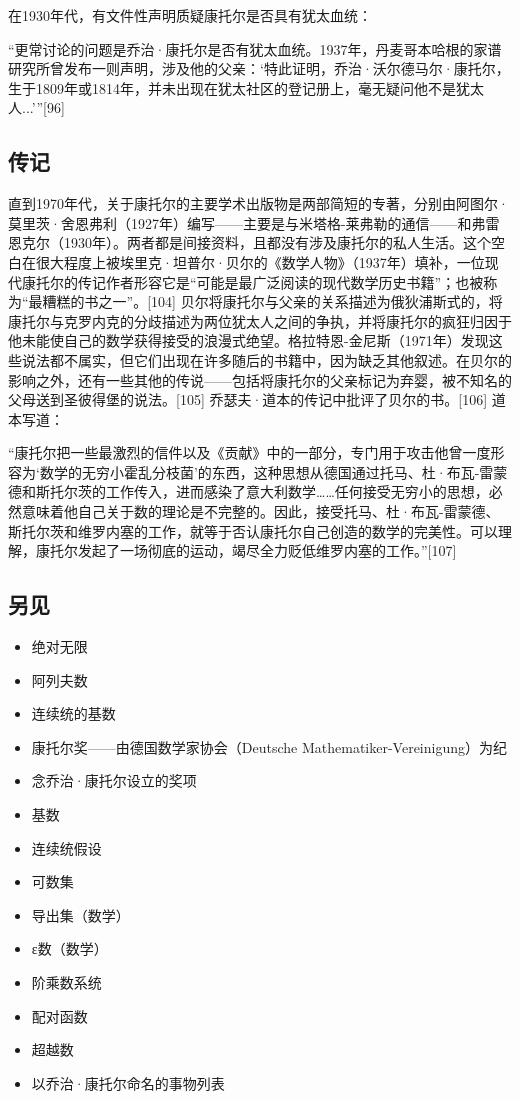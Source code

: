 在1930年代，有文件性声明质疑康托尔是否具有犹太血统：

“更常讨论的问题是乔治·康托尔是否有犹太血统。1937年，丹麦哥本哈根的家谱研究所曾发布一则声明，涉及他的父亲：‘特此证明，乔治·沃尔德马尔·康托尔，生于1809年或1814年，并未出现在犹太社区的登记册上，毫无疑问他不是犹太人...’”[96]
\subsection{传记}  
直到1970年代，关于康托尔的主要学术出版物是两部简短的专著，分别由阿图尔·莫里茨·舍恩弗利（1927年）编写——主要是与米塔格-莱弗勒的通信——和弗雷恩克尔（1930年）。两者都是间接资料，且都没有涉及康托尔的私人生活。这个空白在很大程度上被埃里克·坦普尔·贝尔的《数学人物》（1937年）填补，一位现代康托尔的传记作者形容它是“可能是最广泛阅读的现代数学历史书籍”；也被称为“最糟糕的书之一”。[104] 贝尔将康托尔与父亲的关系描述为俄狄浦斯式的，将康托尔与克罗内克的分歧描述为两位犹太人之间的争执，并将康托尔的疯狂归因于他未能使自己的数学获得接受的浪漫式绝望。格拉特恩-金尼斯（1971年）发现这些说法都不属实，但它们出现在许多随后的书籍中，因为缺乏其他叙述。在贝尔的影响之外，还有一些其他的传说——包括将康托尔的父亲标记为弃婴，被不知名的父母送到圣彼得堡的说法。[105] 乔瑟夫·道本的传记中批评了贝尔的书。[106] 道本写道：

“康托尔把一些最激烈的信件以及《贡献》中的一部分，专门用于攻击他曾一度形容为‘数学的无穷小霍乱分枝菌’的东西，这种思想从德国通过托马、杜·布瓦-雷蒙德和斯托尔茨的工作传入，进而感染了意大利数学……任何接受无穷小的思想，必然意味着他自己关于数的理论是不完整的。因此，接受托马、杜·布瓦-雷蒙德、斯托尔茨和维罗内塞的工作，就等于否认康托尔自己创造的数学的完美性。可以理解，康托尔发起了一场彻底的运动，竭尽全力贬低维罗内塞的工作。”[107]
\subsection{另见}
\begin{itemize}
\item 绝对无限  
\item 阿列夫数  
\item 连续统的基数  
\item 康托尔奖——由德国数学家协会（Deutsche Mathematiker-Vereinigung）为纪\item 念乔治·康托尔设立的奖项  
\item 基数  
\item 连续统假设  
\item 可数集  
\item 导出集（数学）  
\item ε数（数学）  
\item 阶乘数系统  
\item 配对函数  
\item 超越数  
\item 以乔治·康托尔命名的事物列表
\end{itemize}
